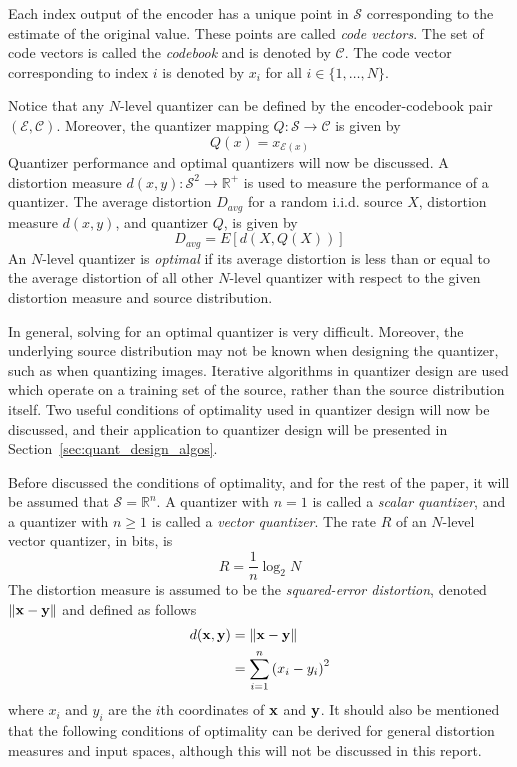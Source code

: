 Each index output of the encoder has a unique point in $\mathcal{S}$ corresponding to the estimate of the original value. These points are called \emph{code vectors}. The set of code vectors is called the \emph{codebook} and is denoted by $\mathcal{C}$. The code vector corresponding to index $i$ is denoted by $x_i$ for all $i \in \{1,\ldots,N\}$.

Notice that any $N$-level quantizer can be defined by the encoder-codebook pair $(\mathcal{E}, \mathcal{C})$. Moreover, the quantizer mapping $Q : \mathcal{S} \rightarrow \mathcal{C}$ is given by
\begin{equation}
Q(x) = x_{\mathcal{E}(x)}
\end{equation}
Quantizer performance and optimal quantizers will now be discussed. A distortion measure $d(x,y) : \mathcal{S}^2 \rightarrow \mathbb{R}^+$ is used to measure the performance of a quantizer. The average distortion $D_{avg}$ for a random i.i.d. source $X$, distortion measure $d(x,y)$, and quantizer $Q$, is given by
\begin{equation}
  \label{eq:D_avg}
D_{avg} = E[d(X,Q(X))]
\end{equation}
An $N$-level quantizer is \emph{optimal} if its average distortion is less than or equal to the average distortion of all other $N$-level quantizer with respect to the given distortion measure and source distribution.

In general, solving for an optimal quantizer is very difficult. Moreover, the underlying source distribution may not be known when designing the quantizer, such as when quantizing images. Iterative algorithms in quantizer design are used which operate on a training set of the source, rather than the source distribution itself. Two useful conditions of optimality used in quantizer design will now be discussed, and their application to quantizer design will be presented in Section~\ref{sec:quant_design_algos}.

Before discussed the conditions of optimality, and for the rest of the paper, it will be assumed that $\mathcal{S}=\mathbb{R}^n$. A quantizer with $n=1$ is called a \emph{scalar quantizer}, and a quantizer with $n \ge 1$ is called a \emph{vector quantizer}. The rate $R$ of an $N$-level vector quantizer, in bits, is
\begin{equation}
R = \frac{1}{n}\log_2 N
\end{equation}
The distortion measure is assumed to be the \emph{squared-error distortion}, denoted ${\bf \| x - y \|}$ and defined as follows
\begin{align}
d(\bf x, \bf y) &= {\bf \| x - y \|} \\
&= \sum_{i=1}^n{(x_i - y_i)}^2
\end{align}
where $x_i$ and $y_i$ are the $i$th coordinates of $\bf x$ and $\bf y$. It should also be mentioned that the following conditions of optimality can be derived for general distortion measures and input spaces, although this will not be discussed in this report.

